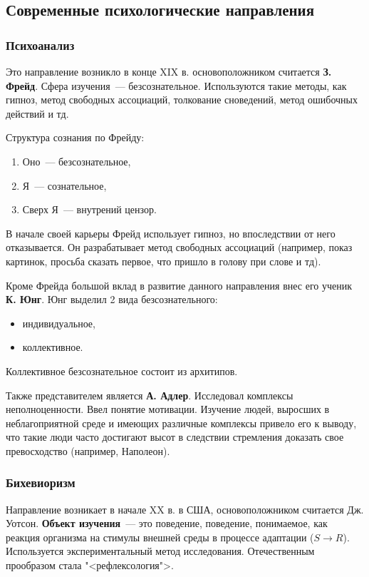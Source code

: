 \subsection{Современные психологические направления}
\subsubsection{Психоанализ}
Это направление возникло в конце XIX в. основоположником считается \textbf{З. Фрейд}. Сфера изучения~--- безсознательное. Используются такие методы, как гипноз, метод свободных ассоциаций, толкование сноведений, метод ошибочных действий и тд.

Структура сознания по Фрейду:
\begin{enumerate}
	\item Оно~--- безсознательное,
	\item Я~--- сознательное,
	\item Сверх Я~--- внутрений цензор.
\end{enumerate}

В начале своей карьеры Фрейд использует гипноз, но впоследствии от него отказывается. Он разрабатывает метод свободных ассоциаций (например, показ картинок, просьба сказать первое, что пришло в голову при слове и тд).

Кроме Фрейда большой вклад в развитие данного направления внес его ученик \textbf{К. Юнг}. Юнг выделил 2 вида безсознательного:
\begin{itemize}
	\item индивидуальное,
	\item коллективное.
\end{itemize}

Коллективное безсознательное состоит из архитипов.

Также представителем является \textbf{А. Адлер}. Исследовал комплексы неполноценности. Ввел понятие мотивации. Изучение людей, выросших в неблагоприятной среде и имеющих различные комплексы привело его к выводу, что такие люди часто достигают высот в следствии стремления доказать свое превосходство (например, Наполеон).

\subsubsection{Бихевиоризм}
Направление возникает в начале XX в. в США, основоположником считается Дж. Уотсон. \textbf{Объект изучения}~--- это поведение, поведение, понимаемое, как реакция организма на стимулы внешней среды в процессе адаптации ($S\rightarrow{}R$). Используется экспериментальный метод исследования. Отечественным прообразом стала "<рефлексология">.

